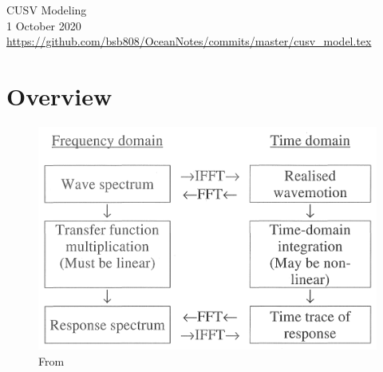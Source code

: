 \documentclass[11pt, letterpaper]{article}
\newcommand{\doctitle}{CUSV Modeling}
\newif\ifoverleaf %
\begin{document}
\overleaffalse

\newcommand{\SF}{0.2}
\newcommand{\SFb}{0.45}
\newcommand{\SFPic}{0.45}
\newcommand{\SFPlot}{0.45}
\newcommand{\SFc}{0.25}
\newcommand{\FigWidth}{\SFb}

\newpage
\begin{center}
{\huge \doctitle} \\
{\Large 1 October 2020} \\
\url{https://github.com/bsb808/OceanNotes/commits/master/cusv_model.tex}
\end{center}

\section{Overview}

\begin{figure}[hbt!]
\centering
\includegraphics[width=0.6\linewidth]{images/bergdahl_roads.png}
\caption{From \cite{bergdahl09wave}}
\label{f:wave}
\end{figure}
\end{document}
